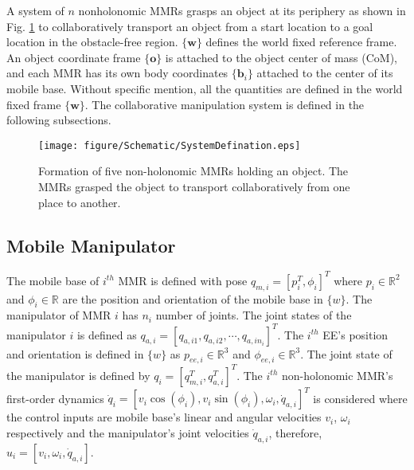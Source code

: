 A system of $n$ nonholonomic MMRs grasps an object at its periphery as shown in Fig. \ref{fig:1} to collaboratively transport an object from a start location to a goal location in the obstacle-free region. $\{\boldsymbol{w}\}$ defines the world fixed reference frame. An object coordinate frame $\{\boldsymbol{o}\}$ is attached to the object center of mass (CoM), and each MMR has its own body coordinates $\{\boldsymbol{b}_i\}$ attached to the center of its mobile base. Without specific mention, all the quantities are defined in the world fixed frame $\boldsymbol{\{w\}}$. The collaborative manipulation system is defined in the following subsections.

\begin{figure}[htbp]
	\centerline{\texttt{[image: figure/Schematic/SystemDefination.eps]}}
	\caption{Formation of five non-holonomic MMRs holding an object. The MMRs grasped the object to transport collaboratively from one place to another.}
	\label{fig:1}
\end{figure}

\subsection{Mobile Manipulator}
The mobile base of $i^{th}$ MMR is defined with pose $q_{m,i}=[p^T_i,\phi_i]^T$ where $p_i\in\mathbb{R}^2$ and $\phi_i\in\mathbb{R}$ are the position and orientation of the mobile base in $\{w\}$. The manipulator of MMR $i$ has $n_i$ number of joints. The joint states of the manipulator $i$ is defined as $q_{a,i} = [q_{a,i1},q_{a,i2},\cdots, q_{a,in_i}]^T$. The $i^{th}$ EE's position and orientation is defined in $\{w\}$ as $p_{ee,i}\in\mathbb{R}^3$ and $\phi_{ee,i}\in\mathbb{R}^3$. The joint state of the manipulator is defined by $q_i=[q_{m,i}^T,q_{a,i}^T]^T$. 
The $i^{th}$ non-holonomic MMR's first-order dynamics $\dot{q}_i =[v_{i}\cos(\phi_i), v_{i}\sin(\phi_i),\omega_{i},\dot{q}_{a,i}]^T$ is considered where the control inputs are mobile base's linear and angular velocities $v_{i}$, $\omega_{i}$ respectively and the manipulator's joint velocities $\dot{q}_{a,i}$, therefore, $u_i = [v_{i},\omega_{i},\dot{q}_{a,i} ]$. 

